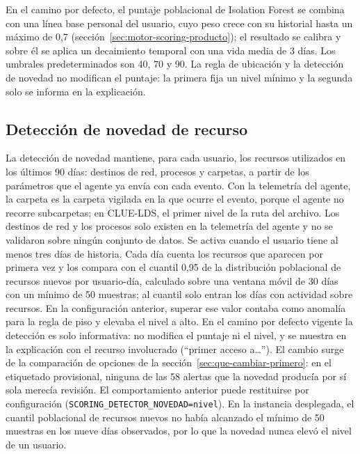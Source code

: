 En el camino por defecto, el puntaje poblacional de Isolation Forest se combina con una línea base personal del usuario, cuyo peso crece con su historial hasta un máximo de 0,7 (sección~\ref{sec:motor-scoring-producto}); el resultado se calibra y sobre él se aplica un decaimiento temporal con una vida media de 3 días. Los umbrales predeterminados son 40, 70 y 90. La regla de ubicación y la detección de novedad no modifican el puntaje: la primera fija un nivel mínimo y la segunda solo se informa en la explicación.

\subsection{Detección de novedad de recurso}
\label{sec:novedad-recurso}
La detección de novedad mantiene, para cada usuario, los recursos utilizados en los últimos 90 días: destinos de red, procesos y carpetas, a partir de los parámetros que el agente ya envía con cada evento. Con la telemetría del agente, la carpeta es la carpeta vigilada en la que ocurre el evento, porque el agente no recorre subcarpetas; en CLUE-LDS, el primer nivel de la ruta del archivo. Los destinos de red y los procesos solo existen en la telemetría del agente y no se validaron sobre ningún conjunto de datos. Se activa cuando el usuario tiene al menos tres días de historia. Cada día cuenta los recursos que aparecen por primera vez y los compara con el cuantil 0,95 de la distribución poblacional de recursos nuevos por usuario-día, calculado sobre una ventana móvil de 30 días con un mínimo de 50 muestras; al cuantil solo entran los días con actividad sobre recursos. En la configuración anterior, superar ese valor contaba como anomalía para la regla de piso y elevaba el nivel a alto. En el camino por defecto vigente la detección es solo informativa: no modifica el puntaje ni el nivel, y se muestra en la explicación con el recurso involucrado (``primer acceso a\ldots''). El cambio surge de la comparación de opciones de la sección~\ref{sec:que-cambiar-primero}: en el etiquetado provisional, ninguna de las 58 alertas que la novedad producía por sí sola merecía revisión. El comportamiento anterior puede restituirse por configuración (\texttt{SCORING\_\allowbreak{}DETECTOR\_\allowbreak{}NOVEDAD=\allowbreak{}nivel}). En la instancia desplegada, el cuantil poblacional de recursos nuevos no había alcanzado el mínimo de 50 muestras en los nueve días observados, por lo que la novedad nunca elevó el nivel de un usuario.

